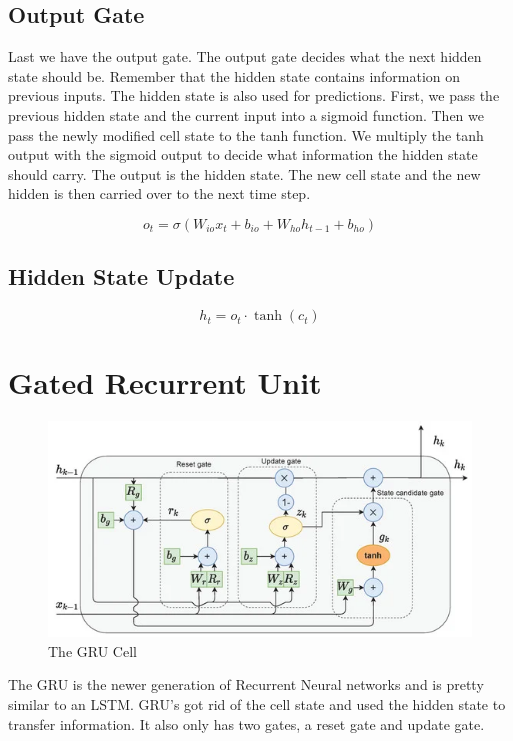 \documentclass{report}
\begin{document}
\subsection{Output Gate}
Last we have the output gate. The output gate decides what the next hidden state should be. Remember that the hidden state contains information on previous inputs. The hidden state is also used for predictions. First, we pass the previous hidden state and the current input into a sigmoid function. Then we pass the newly modified cell state to the tanh function. We multiply the tanh output with the sigmoid output to decide what information the hidden state should carry. The output is the hidden state. The new cell state and the new hidden is then carried over to the next time step.

   \[
   o_t = \sigma(W_{io} x_t + b_{io} + W_{ho} h_{t-1} + b_{ho})
   \]

\subsection{Hidden State Update}
   \[
   h_t = o_t \cdot \tanh(c_t)
   \]

\section{Gated Recurrent Unit}
\begin{figure}[ht]
	\includegraphics[width=350pt]{44}
	\centering
	\caption{The GRU Cell}
\end{figure}

The GRU is the newer generation of Recurrent Neural networks and is pretty similar to an LSTM. GRU’s got rid of the cell state and used the hidden state to transfer information. It also only has two gates, a reset gate and update gate.
\end{document}
